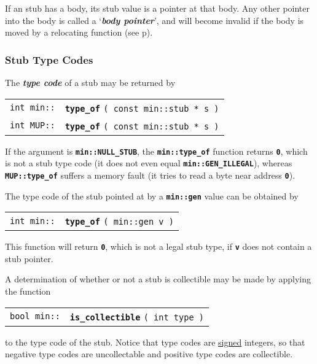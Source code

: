 \documentclass[12pt]{article}
\makeatletter
\newcommand{\TT}[1]{{\tt \bfseries #1}}
\newcommand{\key}[1]{{\bf \em #1}\index{#1}}
\newcommand{\ttindex}[1]{\index{#1@{\tt #1}}}
\newcommand{\pagref}[1]{p\pageref{#1}}
\newcommand{\EOL}{\penalty \exhyphenpenalty}
\newenvironment{indpar}[1][0.3in]%
	{\begin{list}{}%
		     {\setlength{\itemsep}{0in}%
		      \setlength{\topsep}{0in}%
		      \setlength{\parsep}{1ex}%
		      \setlength{\labelwidth}{#1}%
		      \setlength{\leftmargin}{#1}%
		      \addtolength{\leftmargin}{\labelsep}}%
	 \item}%
	{\end{list}}
\newcommand{\LABEL}[1]{\label{#1}}
\newcommand{\MINKEY}[1]%
	   {\TT{#1}\ttindex{min::#1}\ttindex{#1}}
\newcommand{\MUPKEY}[1]%
	   {\TT{#1}\ttindex{MUP::#1}\ttindex{#1}}
\makeatother
\begin{document}
If an stub has a body, its stub value is a pointer at that body.
Any other pointer into the body is called a `\key{body pointer}', and
will become invalid if the body is moved
by a relocating function (see \pagref{RELOCATING-FUNCTIONS}).

\subsubsection{Stub Type Codes}
\label{STUB-TYPE-CODES}

The \key{type code} of a stub may be returned by

\begin{indpar}\begin{tabular}{r@{}l}
\verb|int min::| & \MINKEY{type\_of} \verb|( const min::stub * s )|
\LABEL{MIN::TYPE_OF} \\
\verb|int MUP::| & \MUPKEY{type\_of} \verb|( const min::stub * s )|
\LABEL{MUP::TYPE_OF}
\end{tabular}\end{indpar}

If the argument is \TT{min::NULL\_STUB},
the \TT{min::type\_of} function returns \TT{0}, which is not
a stub type code (it does not even equal \TT{min::GEN\_ILLEGAL}),
whereas \TT{MUP::\EOL type\_\EOL of} suffers a memory fault (it
tries to read a byte near address \TT{0}).

The type code of the stub pointed at by a \TT{min::gen} value
can be obtained by

\begin{indpar}\begin{tabular}{r@{}l}
\verb|int min::| & \MINKEY{type\_of} \verb|( min::gen v )|
\LABEL{MIN::TYPE_OF_GEN}
\end{tabular}\end{indpar}

This function will return \TT{0}, which is not a legal stub type,
if \TT{v} does not contain a stub pointer.

A determination of whether or not a stub is collectible may be made
by applying the function

\begin{indpar}\begin{tabular}{r@{}l}
\verb|bool min::| & \MINKEY{is\_collectible} \verb|( int type )|
\LABEL{MIN::IS_COLLECTIBLE}
\end{tabular}\end{indpar}

to the type code of the stub.  Notice that type codes are \underline{signed}
integers, so that negative type codes are uncollectable and positive type codes
are collectible.
\end{document}
